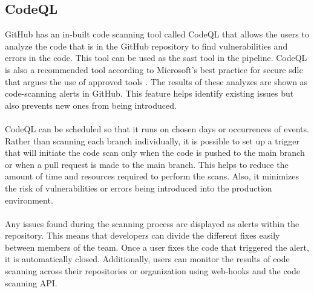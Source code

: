 \subsection{CodeQL}
GitHub has an in-built code scanning tool called CodeQL that allows the users to analyze the code that is in the GitHub repository to find vulnerabilities and errors in the code. This tool can be used as the \acrshort{sast} tool in the \gls{pipeline}. CodeQL is also a recommended tool according to Microsoft's best practice for secure \acrshort{sdlc} that argues the use of approved tools \cite{microsoftSDLCpractices}. The results of these analyzes are shown as code-scanning alerts in GitHub. This feature helps identify existing issues but also prevents new ones from being introduced. \cite{CodeQL1}
\\~\\
CodeQL can be scheduled so that it runs on chosen days or occurrences of events. Rather than scanning each branch individually, it is possible to set up a trigger that will initiate the code scan only when the code is pushed to the main branch or when a pull request is made to the main branch. This helps to reduce the amount of time and resources required to perform the scans. Also, it minimizes the risk of vulnerabilities or errors being introduced into the production environment.
\\~\\
Any issues found during the scanning process are displayed as alerts within the repository. This means that developers can divide the different fixes easily between members of the team.  Once a user fixes the code that triggered the alert, it is automatically closed. Additionally, users can monitor the results of code scanning across their repositories or organization using web-hooks and the code scanning API. 
\cite{GithubCodeScanning}

